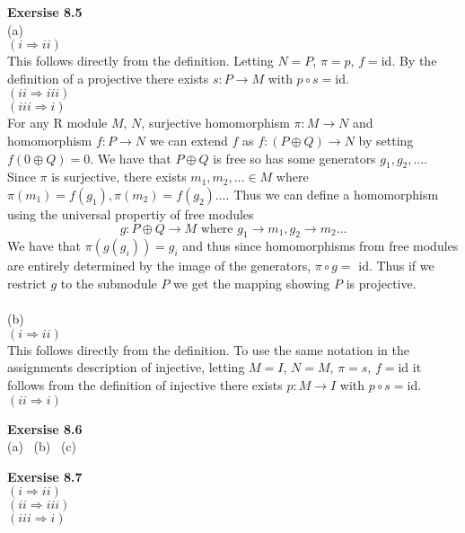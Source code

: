 \documentclass[12pt]{article}
\newenvironment{ques}[1]{\textbf{Exersise #1}\vspace{1 mm}\\ }{\bigskip}
\theoremstyle{definition}
\begin{document}
\begin{ques}{8.5}
	(a) \\
	$(i \Rightarrow ii)$\\
	This follows directly from the definition. Letting $N = P$, $\pi = p$, $f =
	$id. By the definition of a projective there exists $s: P \to M$ with $p
	\circ s = $id.\\
	$(ii \Rightarrow iii)$\\

	$(iii \Rightarrow i)$\\
	For any R module $M$, $N$, surjective homomorphism $\pi : M \to N$ and
	homomorphism $f: P \to N$ we can extend $f$ as $f:(P \oplus Q) \to N$ by
	setting $f(0 \oplus Q) =
	0$. We have that $P \oplus Q$ is free so has some generators $g_1, g_2,
	\dots$. Since $\pi$ is surjective, there exists $m_1, m_2, \dots \in M$
	where $\pi(m_1) = f(g_1), \pi(m_2) = f(g_2) \dots $. Thus we can define a
	homomorphism using the universal propertiy of free modules
	$$g: P \oplus Q \to M \text{ where } g_1 \to m_1, g_2 \to m_2 \dots$$
	We have that $\pi(g(g_i)) = g_i$ and thus since homomorphisms from free
	modules are entirely determined by the image of the generators, $\pi \circ
	g =$ id. Thus if we restrict $g$ to the submodule $P$ we get the mapping
	showing $P$ is projective.\\
	\\
	(b) \\
	$(i \Rightarrow ii)$\\
	This follows directly from the definition. To use the same notation in the
	assignments description of injective, letting $M = I$, $N = M$, $\pi = s$, $f =
	$id it follows from the definition of injective there exists $p: M \to I$ with $p
	\circ s = $id.\\
	$(ii \Rightarrow i)$\\

\end{ques}

\begin{ques}{8.6}
	(a) \ 
	(b) \ 
	(c) \ 

\end{ques}

\begin{ques}{8.7}
	$(i \Rightarrow ii)$\\
	$(ii \Rightarrow iii)$\\
	$(iii \Rightarrow i)$\\

\end{ques}
\end{document}
